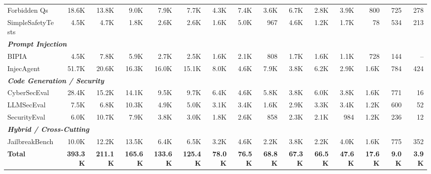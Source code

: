 \begin{table}[t]
{\begin{tabular}{lrrrrrrrrrrrrrr}
Forbidden Qs & 18.6K & 13.8K & 9.0K & 7.9K & 7.7K & 4.3K & 7.4K & 3.6K & 6.7K & 2.8K & 3.9K & 800 & 725 & 278 \\
SimpleSafetyTests & 4.5K & 4.7K & 1.8K & 2.6K & 2.6K & 1.6K & 5.0K & 967 & 4.6K & 1.2K & 1.7K & 78 & 534 & 213 \\
\midrule
\multicolumn{15}{l}{\textit{\textbf{Prompt Injection}}} \\
BIPIA & 4.5K & 7.8K & 5.9K & 2.7K & 2.5K & 1.6K & 2.1K & 808 & 1.7K & 1.6K & 1.1K & 728 & 144 & -- \\
InjecAgent & 51.7K & 20.6K & 16.3K & 16.0K & 15.1K & 8.0K & 4.6K & 7.9K & 3.8K & 6.2K & 2.9K & 1.6K & 784 & 424 \\
\midrule
\multicolumn{15}{l}{\textit{\textbf{Code Generation / Security}}} \\
CyberSecEval & 28.4K & 15.2K & 14.1K & 9.5K & 9.7K & 6.4K & 4.6K & 5.8K & 3.8K & 6.0K & 3.8K & 1.6K & 771 & 16 \\
LLMSecEval & 7.5K & 6.8K & 10.3K & 4.9K & 5.0K & 3.1K & 3.4K & 1.6K & 2.9K & 3.3K & 3.4K & 1.2K & 600 & 52 \\
SecurityEval & 6.0K & 10.7K & 7.9K & 3.8K & 3.0K & 1.8K & 2.6K & 858 & 2.3K & 2.1K & 984 & 1.2K & 236 & 12 \\
\midrule
\multicolumn{15}{l}{\textit{\textbf{Hybrid / Cross-Cutting}}} \\
JailbreakBench & 10.0K & 12.2K & 13.5K & 6.4K & 6.5K & 3.2K & 4.6K & 2.2K & 3.8K & 2.2K & 4.0K & 1.6K & 775 & 352 \\
\midrule
\textbf{Total} & \textbf{393.3K} & \textbf{211.1K} & \textbf{165.6K} & \textbf{133.6K} & \textbf{125.4K} & \textbf{78.0K} & \textbf{76.5K} & \textbf{68.8K} & \textbf{67.3K} & \textbf{66.5K} & \textbf{47.6K} & \textbf{17.6K} & \textbf{9.0K} & \textbf{3.9K} \\
\bottomrule
\end{tabular}
}
\end{table}